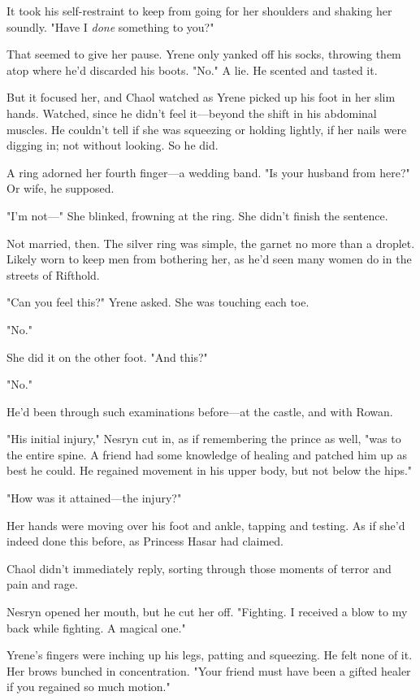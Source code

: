 It took his self-restraint to keep from going for her shoulders and shaking her soundly. "Have I \emph{done} something to you?"

That seemed to give her pause. Yrene only yanked off his socks, throwing them atop where he'd discarded his boots. "No." A lie. He scented and tasted it.

But it focused her, and Chaol watched as Yrene picked up his foot in her slim hands. Watched, since he didn't feel it---beyond the shift in his abdominal muscles. He couldn't tell if she was squeezing or holding lightly, if her nails were digging in; not without looking. So he did.

A ring adorned her fourth finger---a wedding band. "Is your husband from here?" Or wife, he supposed.

"I'm not---" She blinked, frowning at the ring. She didn't finish the sentence.

Not married, then. The silver ring was simple, the garnet no more than a droplet. Likely worn to keep men from bothering her, as he'd seen many women do in the streets of Rifthold.

"Can you feel this?" Yrene asked. She was touching each toe.

"No."

She did it on the other foot. "And this?"

"No."

He'd been through such examinations before---at the castle, and with Rowan.

"His initial injury," Nesryn cut in, as if remembering the prince as well, "was to the entire spine. A friend had some knowledge of healing and patched him up as best he could. He regained movement in his upper body, but not below the hips."

"How was it attained---the injury?"

Her hands were moving over his foot and ankle, tapping and testing. As if she'd indeed done this before, as Princess Hasar had claimed.

Chaol didn't immediately reply, sorting through those moments of terror and pain and rage.

Nesryn opened her mouth, but he cut her off. "Fighting. I received a blow to my back while fighting. A magical one."

Yrene's fingers were inching up his legs, patting and squeezing. He felt none of it. Her brows bunched in concentration. "Your friend must have been a gifted healer if you regained so much motion."

